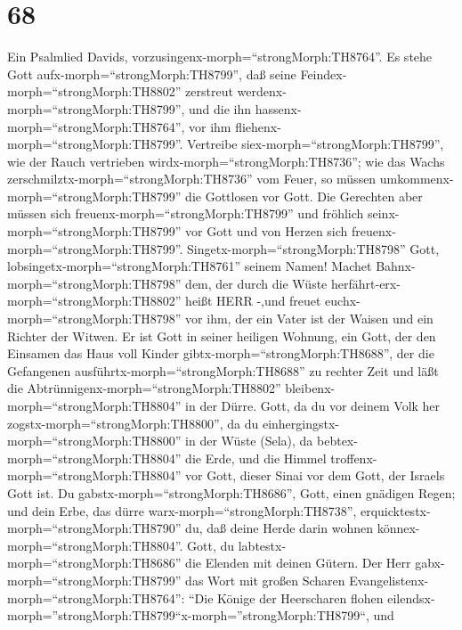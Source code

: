 \hypertarget{section-67}{%
\section{68}\label{section-67}}

 Ein Psalmlied Davids,
vorzusingenx-morph=``strongMorph:TH8764''. Es stehe Gott
aufx-morph=``strongMorph:TH8799'', daß seine
Feindex-morph=``strongMorph:TH8802'' zerstreut
werdenx-morph=``strongMorph:TH8799'', und die ihn
hassenx-morph=``strongMorph:TH8764'', vor ihm
fliehenx-morph=``strongMorph:TH8799''.  Vertreibe
siex-morph=``strongMorph:TH8799'', wie der Rauch vertrieben
wirdx-morph=``strongMorph:TH8736''; wie das Wachs
zerschmilztx-morph=``strongMorph:TH8736'' vom Feuer, so müssen
umkommenx-morph=``strongMorph:TH8799'' die Gottlosen vor Gott.
 Die Gerechten aber müssen sich
freuenx-morph=``strongMorph:TH8799'' und fröhlich
seinx-morph=``strongMorph:TH8799'' vor Gott und von Herzen sich
freuenx-morph=``strongMorph:TH8799''. 
Singetx-morph=``strongMorph:TH8798'' Gott,
lobsingetx-morph=``strongMorph:TH8761'' seinem Namen! Machet
Bahnx-morph=``strongMorph:TH8798'' dem, der durch die Wüste
herfährt-erx-morph=``strongMorph:TH8802'' heißt HERR -,und freuet
euchx-morph=``strongMorph:TH8798'' vor ihm,  der ein Vater
ist der Waisen und ein Richter der Witwen. Er ist Gott in seiner
heiligen Wohnung,  ein Gott, der den Einsamen das Haus voll
Kinder gibtx-morph=``strongMorph:TH8688'', der die Gefangenen
ausführtx-morph=``strongMorph:TH8688'' zu rechter Zeit und läßt die
Abtrünnigenx-morph=``strongMorph:TH8802''
bleibenx-morph=``strongMorph:TH8804'' in der Dürre.  Gott,
da du vor deinem Volk her zogstx-morph=``strongMorph:TH8800'', da du
einhergingstx-morph=``strongMorph:TH8800'' in der Wüste (Sela),
 da bebtex-morph=``strongMorph:TH8804'' die Erde, und die
Himmel troffenx-morph=``strongMorph:TH8804'' vor Gott, dieser Sinai vor
dem Gott, der Israels Gott ist.  Du
gabstx-morph=``strongMorph:TH8686'', Gott, einen gnädigen Regen; und
dein Erbe, das dürre warx-morph=``strongMorph:TH8738'',
erquicktestx-morph=``strongMorph:TH8790'' du,  daß deine
Herde darin wohnen könnex-morph=``strongMorph:TH8804''. Gott, du
labtestx-morph=``strongMorph:TH8686'' die Elenden mit deinen Gütern.
 Der Herr gabx-morph=``strongMorph:TH8799'' das Wort mit
großen Scharen Evangelistenx-morph=``strongMorph:TH8764'': 
``Die Könige der Heerscharen flohen
eilendsx-morph=''strongMorph:TH8799``x-morph=''strongMorph:TH8799``, und
